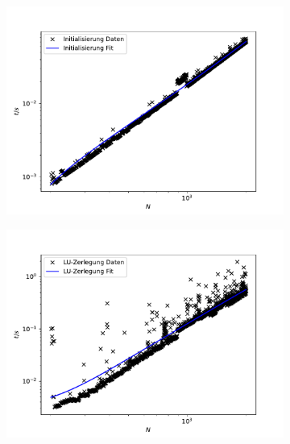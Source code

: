 \documentclass{scrartcl}
\begin{document}
 		\begin{figure}[h!]
 		\centering
 		\begin{subfigure}{0.3\textwidth}
		\includegraphics[width=\textwidth]{A2/build/t1_200.pdf}
		\end{subfigure}
		\begin{subfigure}{0.3\textwidth}
		\includegraphics[width=\textwidth]{A2/build/t2_200.pdf}
		\end{subfigure}
		\begin{subfigure}{0.3\textwidth}

\end{subfigure}
\end{figure}
\end{document}
